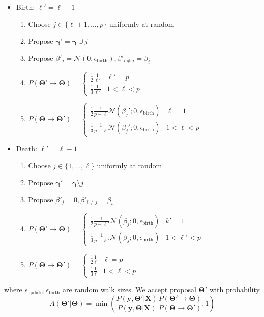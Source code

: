 \documentclass[a4paper,11pt]{article}
\begin{document}
\begin{itemize}
    \item Birth: $\ell' = \ell+1$
    \begin{enumerate}
        \item Choose $j \in \{\ell+1, \ldots, p\}$ uniformly at random
        \item Propose $\mathbf{\gamma}' = \mathbf{\gamma} \cup j$
        \item Propose $\beta'_{j} = \mathcal{N}(0, \epsilon_{\text{birth}}), \beta'_{i \neq j} = \beta_{i}$
        \item $P(\mathbf{\Theta}' \rightarrow \mathbf{\Theta}) = \begin{cases}\frac{1}{2}\frac{1}{\ell'} & \ell'=p \\ \frac{1}{3} \frac{1}{\ell'} & 1<\ell<p \end{cases} $
        \item $P(\mathbf{\Theta} \rightarrow \mathbf{\Theta}') = \begin{cases}\frac{1}{2}\frac{1}{p-\ell} \mathcal{N}(\beta_{j}'; 0,\epsilon_{\text{birth}}) & \ell=1 \\ \frac{1}{3} \frac{1}{p-\ell} \mathcal{N}(\beta_{j}'; 0,\epsilon_{\text{birth}}) & 1<\ell<p \end{cases} $
    \end{enumerate}
\end{itemize}

\begin{itemize}
    \item Death: $\ell' = \ell-1$
    \begin{enumerate}
        \item Choose $j \in \{1, \ldots, \ell\}$ uniformly at random
        \item Propose $\mathbf{\gamma}' = \mathbf{\gamma} \setminus j$ 
        \item Propose $\beta'_{j} = 0, \beta'_{i \neq j} = \beta_{i}$
        \item $P(\mathbf{\Theta}' \rightarrow \mathbf{\Theta}) = \begin{cases}\frac{1}{2}\frac{1}{p-\ell'} \mathcal{N}(\beta_{j}; 0,\epsilon_{\text{birth}}) & k'=1 \\ \frac{1}{3} \frac{1}{p-\ell'} \mathcal{N}(\beta_{j}; 0,\epsilon_{\text{birth}}) & 1<\ell'<p \end{cases} $
        \item $P(\mathbf{\Theta} \rightarrow \mathbf{\Theta}') = \begin{cases}\frac{1}{2}\frac{1}{\ell} & \ell=p \\ \frac{1}{3} \frac{1}{\ell} & 1<\ell<p \end{cases} $
    \end{enumerate}
\end{itemize}
where $\epsilon_{\text{update}}, \epsilon_{\text{birth}}$ are random walk sizes. We accept proposal $\mathbf{\Theta}'$ with probability $$A(\mathbf{\Theta}'|\mathbf{\Theta}) = \min{\left(\frac{P(\mathbf{y}, \mathbf{\Theta'} | \mathbf{X} )}{P(\mathbf{y}, \mathbf{\Theta} | \mathbf{X} )} \frac{P(\mathbf{\Theta}' \rightarrow \mathbf{\Theta})}{P(\mathbf{\Theta} \rightarrow \mathbf{\Theta}')}, 1\right)}$$
\end{document}
